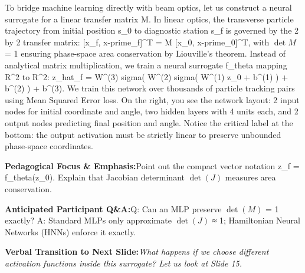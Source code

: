 \documentclass[11pt,a4paper]{article}
\begin{document}
\begin{tcolorbox}[colback=white,colframe=primaryblue,title={\footnotesize\bfseries\color{white}Spoken Presenter Script},fontupper=\small,left=6pt,right=6pt,top=3pt,bottom=3pt,boxrule=0.8pt,arc=2.5pt]
To bridge machine learning directly with beam optics, let us construct a neural surrogate for a linear transfer matrix M. In linear optics, the transverse particle trajectory from initial position s\_0 to diagnostic station s\_f is governed by the 2 by 2 transfer matrix: [x\_f, x-prime\_f]\textasciicircum{}T = M [x\_0, x-prime\_0]\textasciicircum{}T, with $\det M$ = 1 ensuring phase-space area conservation by Liouville's theorem. Instead of analytical matrix multiplication, we train a neural surrogate f\_theta mapping R\textasciicircum{}2 to R\textasciicircum{}2: z\_hat\_f = W\textasciicircum{}(3) sigma( W\textasciicircum{}(2) sigma( W\textasciicircum{}(1) z\_0 + b\textasciicircum{}(1) ) + b\textasciicircum{}(2) ) + b\textasciicircum{}(3). We train this network over thousands of particle tracking pairs using Mean Squared Error loss. On the right, you see the network layout: 2 input nodes for initial coordinate and angle, two hidden layers with 4 units each, and 2 output nodes predicting final position and angle. Notice the critical label at the bottom: the output activation must be strictly linear to preserve unbounded phase-space coordinates.
\end{tcolorbox}
\vspace{0.2em}
\begin{tcolorbox}[colback=lightbg,colframe=bordergray,left=6pt,right=6pt,top=3pt,bottom=3pt,boxrule=0.6pt,arc=2.5pt]
\small
\noindent\textbf{\color{navy}Pedagogical Focus \& Emphasis:}\enspace Point out the compact vector notation z\_f = f\_theta(z\_0). Explain that Jacobian determinant $\det(J)$ measures area conservation.\par\vspace{0.3em}
\noindent\textbf{\color{successgreen}Anticipated Participant Q\&A:}\enspace Q: Can an MLP preserve $\det(M)$ = 1 exactly? A: Standard MLPs only approximate $\det(J)$ ≈ 1; Hamiltonian Neural Networks (HNNs) enforce it exactly.\par\vspace{0.3em}
\noindent\textbf{\color{accent}Verbal Transition to Next Slide:}\enspace \emph{What happens if we choose different activation functions inside this surrogate? Let us look at Slide 15.}
\end{tcolorbox}
\clearpage
\hypertarget{slide.15}{}
{}
\end{document}
